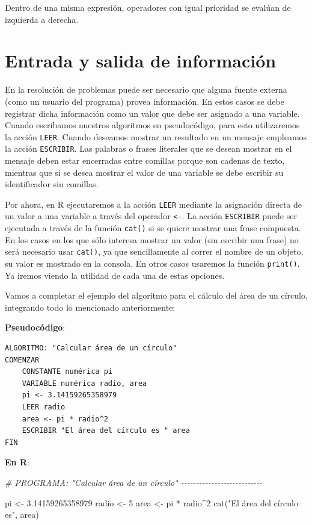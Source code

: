 \documentclass[
]{book}
\newenvironment{Shaded}{\begin{snugshade}}{\end{snugshade}}
\newcommand{\CommentTok}[1]{\textcolor[rgb]{0.56,0.35,0.01}{\textit{#1}}}
\newcommand{\DecValTok}[1]{\textcolor[rgb]{0.00,0.00,0.81}{#1}}
\newcommand{\FloatTok}[1]{\textcolor[rgb]{0.00,0.00,0.81}{#1}}
\newcommand{\FunctionTok}[1]{\textcolor[rgb]{0.00,0.00,0.00}{#1}}
\newcommand{\NormalTok}[1]{#1}
\newcommand{\OtherTok}[1]{\textcolor[rgb]{0.56,0.35,0.01}{#1}}
\newcommand{\SpecialCharTok}[1]{\textcolor[rgb]{0.00,0.00,0.00}{#1}}
\newcommand{\StringTok}[1]{\textcolor[rgb]{0.31,0.60,0.02}{#1}}
\begin{document}
Dentro de una misma expresión, operadores con igual prioridad se evalúan de izquierda a derecha.

\hypertarget{entrada-y-salida-de-informaciuxf3n}{%
\section{Entrada y salida de información}\label{entrada-y-salida-de-informaciuxf3n}}

En la resolución de problemas puede ser necesario que alguna fuente externa (como un usuario del programa) provea información. En estos casos se debe registrar dicha información como un valor que debe ser asignado a una variable. Cuando escribamos nuestros algoritmos en pseudocódigo, para esto utilizaremos la acción \texttt{LEER}. Cuando deseamos mostrar un resultado en un mensaje empleamos la acción \texttt{ESCRIBIR}. Las palabras o frases literales que se desean mostrar en el mensaje deben estar encerradas entre comillas porque son cadenas de texto, mientras que si se desea mostrar el valor de una variable se debe escribir su identificador sin comillas.

Por ahora, en R ejecutaremos a la acción \texttt{LEER} mediante la asignación directa de un valor a una variable a través del operador \texttt{\textless{}-}. La acción \texttt{ESCRIBIR} puede ser ejecutada a través de la función \texttt{cat()} si se quiere mostrar una frase compuesta. En los casos en los que sólo interesa mostrar un valor (sin escribir una frase) no será necesario usar \texttt{cat()}, ya que sencillamente al correr el nombre de un objeto, su valor es mostrado en la consola. En otros casos usaremos la función \texttt{print()}. Ya iremos viendo la utilidad de cada una de estas opciones.

Vamos a completar el ejemplo del algoritmo para el cálculo del área de un círculo, integrando todo lo mencionado anteriormente:

\textbf{Pseudocódigo}:

\begin{verbatim}
ALGORITMO: "Calcular área de un círculo"
COMENZAR
    CONSTANTE numérica pi
    VARIABLE numérica radio, area
    pi <- 3.14159265358979
    LEER radio
    area <- pi * radio^2
    ESCRIBIR "El área del círculo es " area
FIN
\end{verbatim}

\textbf{En R}:

\begin{Shaded}
\begin{Highlighting}[]
\CommentTok{\# PROGRAMA: "Calcular área de un círculo" {-}{-}{-}{-}{-}{-}{-}{-}{-}{-}{-}{-}{-}{-}{-}{-}{-}{-}{-}{-}{-}{-}{-}{-}{-}{-}{-}}

\NormalTok{pi }\OtherTok{\textless{}{-}}  \FloatTok{3.14159265358979}
\NormalTok{radio }\OtherTok{\textless{}{-}} \DecValTok{5}
\NormalTok{area }\OtherTok{\textless{}{-}}\NormalTok{ pi }\SpecialCharTok{*}\NormalTok{ radio}\SpecialCharTok{\^{}}\DecValTok{2}
\FunctionTok{cat}\NormalTok{(}\StringTok{"El área del círculo es"}\NormalTok{, area)}
\end{Highlighting}
\end{Shaded}
\end{document}
